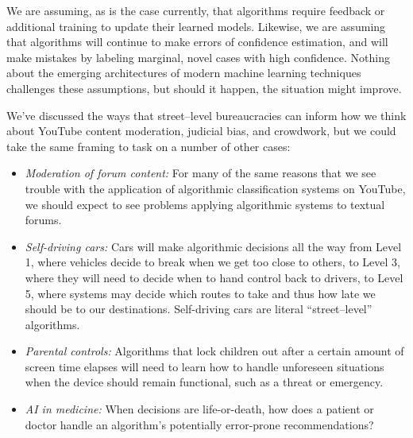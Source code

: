 \documentclass[street-level_algorithms]{subfiles}
\begin{document}
We are assuming, as is the case currently, that
algorithms require feedback or additional training to update their learned models.
Likewise, we are assuming that algorithms will continue to make errors of confidence estimation, and
will make mistakes by labeling marginal, novel cases with high confidence.
Nothing about the emerging architectures of modern machine learning techniques challenges these assumptions, but
should it happen, the situation might improve.

We've discussed the ways that
street--level bureaucracies can inform how we think about
YouTube content moderation, judicial bias, and crowdwork,
but we could take the same framing to task on a number of other cases:
\begin{itemize}[leftmargin=*]
  \item \textit{Moderation of forum content: } For many of the same reasons that
           we see trouble with the application of algorithmic classification systems on YouTube,
           we should expect to see problems applying algorithmic systems to textual forums.
  \item \textit{Self-driving cars: } Cars will make algorithmic decisions all the way
         from Level 1, where vehicles decide to break when we get too close to others,
           to Level 3, where they will need to decide when to hand control back to drivers,
           to Level 5, where systems may decide which routes to take
           and thus how late we should be to our destinations.
           Self-driving cars are literal ``street--level'' algorithms.
  \item \textit{Parental controls: } Algorithms that
          lock children out after a certain amount of screen time elapses will need to learn how to handle unforeseen situations
          when the device should remain functional, such as a threat or emergency.
  \item \textit{AI in medicine: } When decisions are life-or-death,
          how does a patient or doctor handle an algorithm's potentially error-prone recommendations?
\end{itemize}


\onlyinsubfile{
  
  
}
\end{document}
